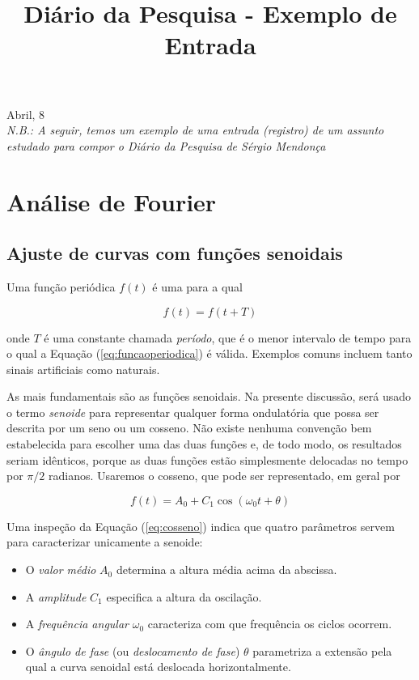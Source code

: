 \documentclass[11pt,a4paper]{article}
\begin{document}
\univlogo

\title{Diário da Pesquisa - Exemplo de Entrada}

{\Huge Abril, 8}\\[5mm]

\textit{N.B.: A seguir, temos um exemplo de uma entrada (registro) de um assunto estudado para compor o Diário da Pesquisa de Sérgio Mendonça}

\section*{Análise de Fourier}

\subsection*{Ajuste de curvas com funções senoidais}

Uma função periódica $f(t)$ é uma para a qual

\begin{equation}
	f(t) = f(t + T)
\label{eq:funcaoperiodica}
\end{equation}

onde $T$ é uma constante chamada \textit{período}, que é o menor intervalo de tempo para o qual a Equação (\ref{eq:funcaoperiodica}) é válida. Exemplos comuns incluem tanto sinais artificiais como naturais.

As mais fundamentais são as funções senoidais. Na presente discussão, será usado o termo \textit{senoide} para representar qualquer forma ondulatória que possa ser descrita por um seno ou um cosseno. Não existe nenhuma convenção bem estabelecida para escolher uma das duas funções e, de todo modo, os resultados seriam idênticos, porque as duas funções estão simplesmente delocadas no tempo por $\pi/2$ radianos. Usaremos o cosseno, que pode ser representado, em geral por

\begin{equation}
	f(t) = A_{0} + C_{1}\cos(\omega_{0}t + \theta)
\label{eq:cosseno}
\end{equation}

Uma inspeção da Equação (\ref{eq:cosseno}) indica que quatro parâmetros servem para caracterizar unicamente a senoide:

\begin{itemize}
	\item O \textit{valor médio} $A_{0}$ determina a altura média acima da abscissa.
	\item A \textit{amplitude} $C_{1}$ especifica a altura da oscilação.
	\item A \textit{frequência angular} $\omega_{0}$ caracteriza com que frequência os ciclos ocorrem.
	\item O \textit{ângulo de fase} (ou \textit{deslocamento de fase}) $\theta$ parametriza a extensão pela qual a curva senoidal está deslocada horizontalmente.
\end{itemize}
\end{document}
